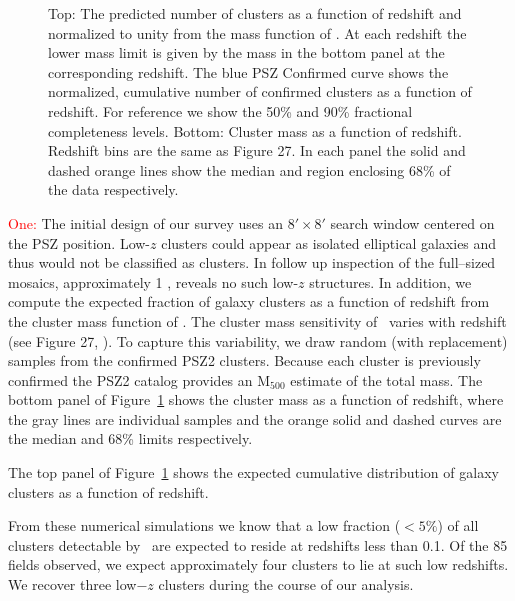\documentclass[apj, revtex4-1]{emulateapj}
\newcommand{\editorial}[1]{\textcolor{red}{#1}}
\begin{document}
\begin{figure}
	\caption{Top: The predicted number of clusters as a function of redshift and normalized to unity from the mass function of \cite{Tinker2008}. At each redshift the lower mass limit is given by the mass in the bottom panel at the corresponding redshift. The blue PSZ Confirmed curve shows the normalized, cumulative number of confirmed clusters as a function of redshift. For reference we show the 50\% and 90\% fractional completeness levels.
	Bottom: Cluster mass as a function of redshift. Redshift bins are the same as \cite{PlanckCollaboration2016} Figure 27.
	In each panel the solid and dashed orange lines show the median and region enclosing 68\% of the data respectively.}
	\label{fig:cluster_forecast}
\end{figure}

\editorial{One:} The initial design of our survey uses an $8'\times8'$ search window centered on the PSZ position. Low-$z$ clusters could appear as isolated elliptical galaxies and thus would not be classified as clusters. In follow up inspection of the full--sized mosaics, approximately 1 \degsq, reveals no such low-$z$ structures. In addition, we compute the expected fraction of galaxy clusters as a function of redshift from the cluster mass function of \cite{Tinker2008}. The cluster mass sensitivity of \planck\ varies with redshift (see Figure 27, \citealt{PlanckCollaboration2016}). To capture this variability, we draw random (with replacement) samples from the confirmed PSZ2 clusters. Because each cluster is previously confirmed the PSZ2 catalog provides an M$_{500}$ estimate of the total mass. The bottom panel of Figure~\ref{fig:cluster_forecast} shows the cluster mass as a function of redshift, where the gray lines are individual samples and the orange solid and dashed curves are the median and 68\% limits respectively.

The top panel of Figure~\ref{fig:cluster_forecast} shows the expected cumulative distribution of galaxy clusters as a function of redshift.

From these numerical simulations we know that a low fraction ($<5\%$) of all clusters detectable by \planck\ are expected to reside at redshifts less than 0.1. Of the 85 fields observed, we expect approximately four clusters to lie at such low redshifts. We recover three low$-z$ clusters during the course of our analysis.
\end{document}
